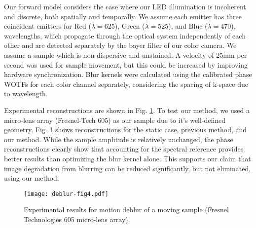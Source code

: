 Our forward model considers the case where our LED illumination is incoherent and discrete, both spatially and temporally. We assume each emitter has three coincident emitters for Red ($\bar{\lambda} = 625$), Green ($\bar{\lambda} = 525$), and Blue ($\bar{\lambda} = 470$), wavelengths, which propagate through the optical system independently of each other and are detected separately by the bayer filter of our color camera. We assume a sample which is non-dispersive and unstained. A velocity of 25mm per second was used for sample movement, but this could be increased by improving hardware synchronization. Blur kernels were calculated using the calibrated phase WOTFs for each color channel separately, considering the spacing of k-space due to wavelength.

Experimental reconstructions are shown in Fig. \ref{fig:deblurResults}. To test our method, we used a micro-lens array (Fresnel-Tech 605) as our sample due to it's well-defined geometry. Fig. \ref{fig:deblurResults} shows reconstructions for the static case, previous method, and our method. While the sample amplitude is relatively unchanged, the phase reconstructions clearly show that accounting for the spectral reference provides better results than optimizing the blur kernel alone. This supports our claim that image degradation from blurring can be reduced significantly, but not eliminated, using our method.

\begin{figure}[ph]
\centering
\texttt{[image: deblur-fig4.pdf]}
\caption{\label{fig:deblurResults}
Experimental results for motion deblur of a moving sample (Fresnel Technologies 605 micro-lens array).}
\end{figure}
